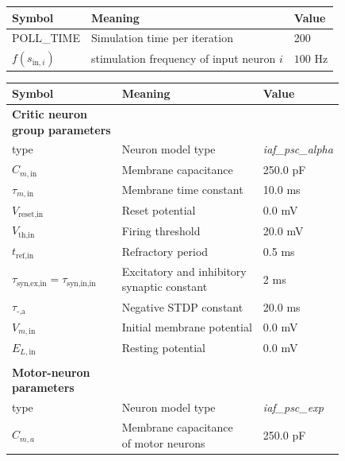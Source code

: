 \documentclass[a4paper,12pt,openright]{book}
\let\oldtable\table
\let\endoldtable\endtable
\renewenvironment{table}[1][htbp] %
{
    \oldtable[#1]
    \footnotesize                     %
}
{
    \endoldtable
}
\begin{document}
\begin{table}[htbp]
\begin{tabular}{lll}
\textbf{Symbol} & \textbf{Meaning} & \textbf{Value} \\ \hline
POLL\_TIME & Simulation time per iteration & 200 \\ \hline
\(f(s_{\text{in}, i})\) & stimulation frequency of input neuron $i$ & $100$ Hz \\ \hline
\end{tabular}
\caption{Simulation parameters}
\label{tab:params1}
\end{table}
\begin{table}[htbp]
\begin{tabular}{lll}
\textbf{Symbol} & \textbf{Meaning} & \textbf{Value} \\ \hline
\thead[l]{\bfseries Critic neuron \\
\bfseries group parameters} \\
type & Neuron model type & \textit{iaf\_psc\_alpha} \\ \hline
\(C_{m,\text{in}}\) & Membrane capacitance & 250.0 pF \\ \hline
\(\tau_{m,\text{in}}\) & Membrane time constant & 10.0 ms \\ \hline
\(V_{\text{reset,in}}\) & Reset potential & 0.0 mV \\ \hline
\(V_{\text{th,in}}\) & Firing threshold & 20.0 mV \\ \hline
\(t_{\text{ref,in}}\) & Refractory period & 0.5 ms \\ \hline
\(\tau_{\text{syn,ex,in}}=\tau_{\text{syn,in,in}}\) & \makecell[l]{Excitatory and inhibitory \\ synaptic constant} & 2 ms \\ \hline
\(\tau_{\text{-,a}}\) & Negative STDP constant & 20.0 ms \\ \hline
\(V_{m,\text{in}}\) & Initial membrane potential & 0.0 mV \\ \hline
\(E_{L,\text{in}}\) & Resting potential & 0.0 mV \\ \hline
\\
\thead[l]{\bfseries Motor-neuron \\
\bfseries parameters} \\
type & Neuron model type & \textit{iaf\_psc\_exp} \\ \hline
\(C_{m,a}\) & \makecell[l]{Membrane capacitance \\ of motor neurons} & 250.0 pF \\ \hline

\end{tabular}
\end{table}
\end{document}
